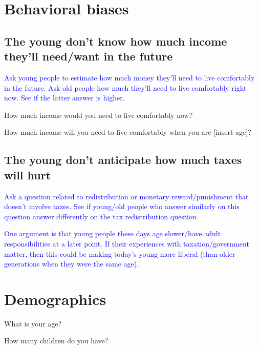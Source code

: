 \documentclass[12pt]{article}
\newcommand{\blue}[1]{\textcolor{blue}{#1}}
\begin{document}
\section{Behavioral biases}
    
    \subsection{The young don't know how much income they'll need/want in the future}

    \blue{Ask young people to estimate how much money they'll need to live comfortably in the future. Ask old people how much they'll need to live comfortably right now. See if the latter answer is higher.}

    How much income would you need to live comfortably now?

    How much income will you need to live comfortably when you are [insert age]?
    
    \subsection{The young don't anticipate how much taxes will hurt}

    \blue{Ask a question related to redistribution or monetary reward/punishment that doesn't involve taxes. See if young/old people who answer similarly on this question answer differently on the tax redistribution question.}

    \blue{One argument is that young people these days age slower/have adult responsibilities at a later point. If their experiences with taxation/government matter, then this could be making today's young more liberal (than older generations when they were the same age).}

\section{Demographics}

    What is your age?

    How many children do you have?

\newpage


\end{document}
